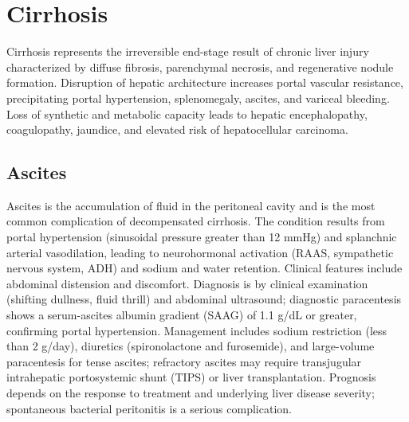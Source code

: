 \section{Cirrhosis}




Cirrhosis represents the irreversible end-stage result of chronic liver injury characterized by diffuse fibrosis, parenchymal necrosis, and regenerative nodule formation. Disruption of hepatic architecture increases portal vascular resistance, precipitating portal hypertension, splenomegaly, ascites, and variceal bleeding. Loss of synthetic and metabolic capacity leads to hepatic encephalopathy, coagulopathy, jaundice, and elevated risk of hepatocellular carcinoma.





\label{sec:section:Cirrhosis}

\subsection{Ascites}
\label{sec:Ascites}
Ascites is the accumulation of fluid in the peritoneal cavity and is the most common complication of decompensated cirrhosis. The condition results from portal hypertension (sinusoidal pressure greater than 12 mmHg) and splanchnic arterial vasodilation, leading to neurohormonal activation (RAAS, sympathetic nervous system, ADH) and sodium and water retention. Clinical features include abdominal distension and discomfort. Diagnosis is by clinical examination (shifting dullness, fluid thrill) and abdominal ultrasound; diagnostic paracentesis shows a serum-ascites albumin gradient (SAAG) of 1.1 g/dL or greater, confirming portal hypertension. Management includes sodium restriction (less than 2 g/day), diuretics (spironolactone and furosemide), and large-volume paracentesis for tense ascites; refractory ascites may require transjugular intrahepatic portosystemic shunt (TIPS) or liver transplantation. Prognosis depends on the response to treatment and underlying liver disease severity; spontaneous bacterial peritonitis is a serious complication.

